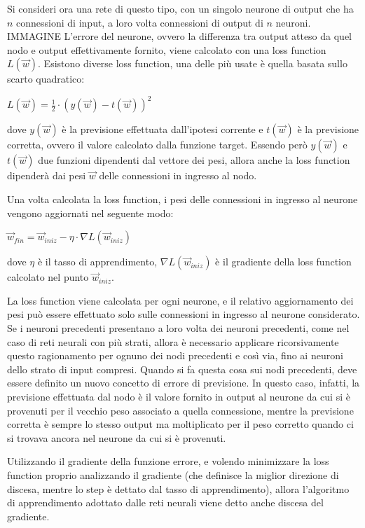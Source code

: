 Si consideri ora una rete di questo tipo, con un singolo neurone di output che ha $n$ connessioni di input, a loro volta connessioni di output di $n$ neuroni.
IMMAGINE
L'errore del neurone, ovvero la differenza tra output atteso da quel nodo e output effettivamente fornito, viene calcolato con una loss function $L(\Vec{w})$. Esistono diverse loss function, una delle più usate è quella basata sullo scarto quadratico:
\begin{center}
    $L(\Vec{w}) = \frac{1}{2} \cdot \left( y(\Vec{w})- t(\Vec{w}) \right)^2$
\end{center}
dove $y(\Vec{w})$ è la previsione effettuata dall'ipotesi corrente e $t(\Vec{w})$ è la previsione corretta, ovvero il valore calcolato dalla funzione target.
Essendo però $y(\Vec{w})$ e $t(\Vec{w})$ due funzioni dipendenti dal vettore dei pesi, allora anche la loss function dipenderà dai pesi $\Vec{w}$ delle connessioni in ingresso al nodo.

Una volta calcolata la loss function, i pesi delle connessioni in ingresso al neurone vengono aggiornati nel seguente modo:
\begin{center}
    $\Vec{w}_{fin} = \Vec{w}_{iniz} - \eta \cdot \nabla L(\Vec{w}_{iniz})$
\end{center}
dove $\eta$ è il tasso di apprendimento, $\nabla L(\Vec{w}_{iniz})$ è il gradiente della loss function calcolato nel punto $\Vec{w}_{iniz}$.

La loss function viene calcolata per ogni neurone, e il relativo aggiornamento dei pesi può essere effettuato solo sulle connessioni in ingresso al neurone considerato.
Se i neuroni precedenti presentano a loro volta dei neuroni precedenti, come nel caso di reti neurali con più strati, allora è necessario applicare ricorsivamente questo ragionamento per ognuno dei nodi precedenti e così via, fino ai neuroni dello strato di input compresi.
Quando si fa questa cosa sui nodi precedenti, deve essere definito un nuovo concetto di errore di previsione. In questo caso, infatti, la previsione effettuata dal nodo è il valore fornito in output al neurone da cui si è provenuti per il vecchio peso associato a quella connessione, mentre la previsione corretta è sempre lo stesso output ma moltiplicato per il peso corretto quando ci si trovava ancora nel neurone da cui si è provenuti.

Utilizzando il gradiente della funzione errore, e volendo minimizzare la loss function proprio analizzando il gradiente (che definisce la miglior direzione di discesa, mentre lo step è dettato dal tasso di apprendimento), allora l'algoritmo di apprendimento adottato dalle reti neurali viene detto anche discesa del gradiente.

